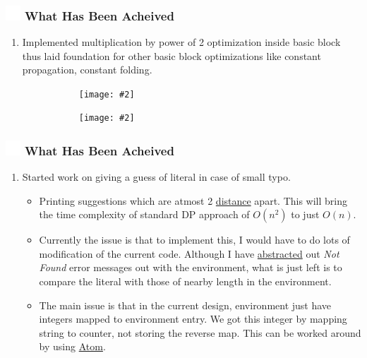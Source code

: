 \documentclass{beamer}
\newcommand{\iph}[2]{
    \texttt{[image: \#2]}
}
\newcommand{\ft}[1]{
  \frametitle{\includegraphics[height=0.55cm, width=0.55cm, keepaspectratio]{assets/tiger.png} #1}
}
\newcounter{saveenumi}
\newcommand{\seti}{\setcounter{saveenumi}{\value{enumi}}}
\newcommand{\conti}{\setcounter{enumi}{\value{saveenumi}}}
\begin{document}
\begin{frame}[fragile]
  \ft{What Has Been Acheived}
  \begin{enumerate}
    \conti
    \item Implemented multiplication by power of 2 optimization inside basic block thus laid foundation for other basic block optimizations like constant propagation, constant folding.
    \begin{figure}[t!]
      \centering
      \begin{subfigure}[t]{\textwidth}
      \centering
      \iph{0.80}{assets/mulopt1.png}
      \label{fig:mulopt1}
      \end{subfigure}
      \begin{subfigure}[t]{0.8\textwidth}
      \centering
      \iph{0.70}{assets/mulopt2.png}
      \label{fig:mulopt2}
      \end{subfigure}
    \end{figure}
    \seti
  \end{enumerate}
\end{frame}

\begin{frame}[fragile]
  \ft{What Has Been Acheived}
  \begin{enumerate}
    \conti
    \item Started work on giving a guess of literal in case of small typo. 
  \begin{itemize}
    \item Printing suggestions which are atmost 2 \href{https://en.wikipedia.org/wiki/Edit_distance}{distance} apart. This will bring the time complexity of standard DP approach of $O(n^2)$ to just $O(n)$. 
    \item Currently the issue is that to implement this, I would have to do lots of modification of the current code. Although I have \href{https://github.com/sourabh2311/btp/commit/8f27478a3c51b9e41bef68961a28c400d4ef29dd}{abstracted} out \textit{Not Found} error messages out with the environment, what is just left is to compare the literal with those of nearby length in the environment. 
    \item The main issue is that in the current design, environment just have integers mapped to environment entry. We got this integer by mapping string to counter, not storing the reverse map. This can be worked around by using \href{http://www.cs.utah.edu/~mjones/sml-nj-lib/atom.html}{Atom}.  
  \end{itemize}
    \seti
  \end{enumerate}
\end{frame}
\end{document}
